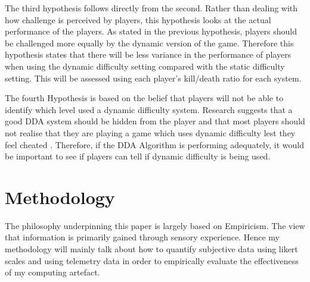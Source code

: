 \documentclass[journal]{IEEEtran}
\begin{document}
The third hypothesis follows directly from the second. Rather than dealing with how challenge is perceived by players, this hypothesis looks at the actual performance of the players. As stated in the previous hypothesis, players should be challenged more equally by the dynamic version of the game. Therefore this hypothesis states that there will be less variance in the performance of players when using the dynamic difficulty setting compared with the static difficulty setting. This will be assessed using each player's kill/death ratio for each system.

The fourth Hypothesis is based on the belief that players will not be able to identify which level used a dynamic difficulty system. Research suggests that a good DDA system should be hidden from the player and that most players should not realise that they are playing a game which uses dynamic difficulty lest they feel cheated \cite{hunicke2005case}. Therefore, if the DDA Algorithm is performing adequately, it would be important to see if players can tell if dynamic difficulty is being used.


\section{Methodology}
The philosophy underpinning this paper is largely based on Empiricism. The view that information is primarily gained through sensory experience. Hence my methodology will mainly talk about how to quantify subjective data using likert scales and using telemetry data in order to empirically evaluate the effectiveness of my computing artefact.
\end{document}
